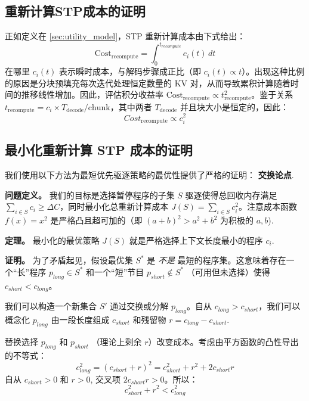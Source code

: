 \subsection{重新计算STP成本的证明}
\label{app:prefill_stpcost}
正如定义在 \autoref{sec:utility_model}，STP 重新计算成本由下式给出：
\begin{equation}
    \text{Cost}_{\text{recompute}} = \int_{0}^{t_{recompute}} c_i(t) \, dt
\end{equation}
在哪里 $c_i(t)$ 表示瞬时成本，与解码步骤成正比（即 $c_i(t) \propto t$）。出现这种比例的原因是分块预填充每次迭代处理恒定数量的 KV 对，从而导致累积计算随着时间的推移线性增加。因此，评估积分收益率 $\text{Cost}_{\text{recompute}} \propto t_{\text{recompute}}^2$。鉴于关系 $t_{\text{recompute}} = c_i \times T_{\text{decode}} / \text{chunk}$，其中两者 $T_{\text{decode}}$ 并且块大小是恒定的，因此：
\begin{equation*}
Cost_{\text{recompute}} \propto c_{i}^2
\end{equation*}

\subsection{最小化重新计算 STP 成本的证明}

\label{app:_minimized_STP_cost}
我们使用以下方法为最短优先驱逐策略的最优性提供了严格的证明： \textbf{交换论点}.

\textbf{问题定义。}
我们的目标是选择暂停程序的子集 $S$ 驱逐使得总回收内存满足 $\sum_{i \in S} c_i \ge \Delta C$，同时最小化总重新计算成本 $J(S) = \sum_{i \in S} c_i^2$。注意成本函数 $f(x) = x^2$ 是严格凸且超可加的（即 $(a+b)^2 > a^2 + b^2$ 为积极的 $a, b$).

\textbf{定理。}
最小化的最优策略 $J(S)$ 就是严格选择上下文长度最小的程序 $c_i$.

\textbf{证明。}
为了矛盾起见，假设最优集 $S^*$ 是 \textit{不是} 最短的程序集。这意味着存在一个“长”程序 $p_{long} \in S^*$ 和一个“短”节目 $p_{short} \notin S^*$ （可用但未选择）使得 $c_{short} < c_{long}$。

我们可以构造一个新集合 $S'$ 通过交换或分解 $p_{long}$。自从 $c_{long} > c_{short}$，我们可以概念化 $p_{long}$ 由一段长度组成 $c_{short}$ 和残留物 $r = c_{long} - c_{short}$.

替换选择 $p_{long}$ 和 $p_{short}$ （理论上剩余 $r$）改变成本。考虑由平方函数的凸性导出的不等式：
\begin{equation}
    c_{long}^2 = (c_{short} + r)^2 = c_{short}^2 + r^2 + 2 c_{short} r
\end{equation}
自从 $c_{short} > 0$ 和 $r > 0$, 交叉项 $2 c_{short} r > 0$。所以：
\begin{equation}
    c_{short}^2 + r^2 < c_{long}^2
\end{equation}

